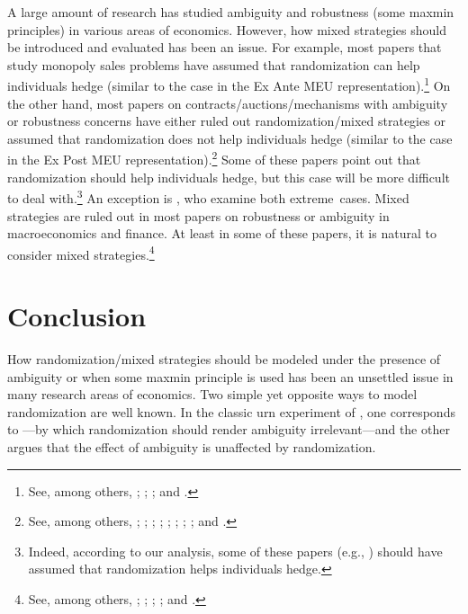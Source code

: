 \documentclass[12pt, notitlepage]{article}
\begin{document}
A large amount of research has studied ambiguity and robustness (some maxmin
principles) in various areas of economics. However, how mixed strategies
should be introduced and evaluated has been an issue. For example, most
papers that study monopoly sales problems have assumed that randomization
can help individuals hedge (similar to the case in the Ex Ante MEU
representation).\footnote{%
See, among others, \cite{LinhartRadner89}; \cite{BergemannSchlag08,
BergemannSchlag11}; \cite{Auster18}; and \cite{CarrascoFarinhaLuzKosEtAl18}.}
On the other hand, most papers on contracts/auctions/mechanisms with
ambiguity or robustness concerns have either ruled out randomization/mixed
strategies or assumed that randomization does not help individuals hedge
(similar to the case in the Ex Post MEU representation).\footnote{%
See, among others, \cite{BoseOzdenorenPape06}; \cite{BoseDaripa09}; \cite%
{Bodoh-Creed12}; \cite{Carroll15, Carroll17}; \cite{Wolitzky16}; \cite%
{CastroLiuYannelis17a, CastroLiuYannelis17b}; \cite{DiTillioKosMessner17}; 
\cite{CarrollSegal18}; and \cite{CastroYannelis18}.} Some of these papers
point out that randomization should help individuals hedge, but this case
will be more difficult to deal with.\footnote{%
Indeed, according to our analysis, some of these papers (e.g., \cite%
{DiTillioKosMessner17}) should have assumed that randomization helps
individuals hedge.} An exception is \cite{BoseRenou14}, who examine both
extreme\ cases. Mixed strategies are ruled out in most papers on robustness
or ambiguity in macroeconomics and finance. At least in some of these
papers, it is natural to consider mixed strategies.\footnote{%
See, among others, \cite{EasleyOHara10}; \cite{EpsteinSchneider10}; \cite%
{Antic14}; \cite{EasleyOHaraYang14}; and \cite{IlutKehrigSchneider17}.}

\section{Conclusion}

How randomization/mixed strategies should be modeled under the presence of
ambiguity or when some maxmin principle is used has been an unsettled issue
in many research areas of economics. Two simple yet opposite ways to model
randomization are well known. In the classic urn experiment of \cite%
{Ellsberg61}, one corresponds to \cite{Raiffa61}---by which randomization
should render ambiguity irrelevant---and the other argues that the effect of
ambiguity is unaffected by randomization.
\end{document}
